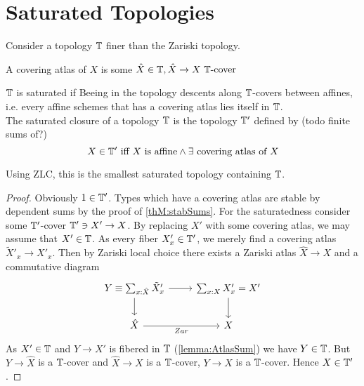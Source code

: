 

\section{Saturated Topologies}
Consider a topology $\mathbb{T}$ finer than the Zariski topology.
\begin{definition}
	A covering atlas of $X$ is  some $\hat X \in \mathbb{T} , \hat X \to X \text{ $\mathbb{T}$-cover }$
\end{definition}
\begin{definition}
	$\mathbb{T}$ is saturated if Beeing in the topology descents along $\mathbb{T}$-covers between affines, i.e. every affine schemes that has a covering atlas lies itself in $\mathbb{T}$. \\
	The saturated closure of a topology $\mathbb{T}$ is the topology $\mathbb{T}'$ defined by (todo finite sums of?)
	\[
	X \in \mathbb{T}' \text{ iff $X$ is affine} \land \exists \text{ covering atlas of } X 
	\]
\end{definition}
\begin{lemma}
	Using ZLC, this is the smallest saturated topology containing $\mathbb{T}$.
\end{lemma}
\begin{proof}
	Obviously $1 \in \mathbb{T}'$. Types which have a covering atlas are stable by dependent sums by the proof of \ref{thM:stabSums}. For the saturatedness consider some $\mathbb{T}'$-cover $\mathbb{T}' \ni X' \to X$. By replacing $X'$ with some covering atlas, we may assume that $X' \in \mathbb{T}$. As every fiber $X'_x \in \mathbb{T}'$, we merely find a covering atlas $\tilde X'_x \to X'_x$. Then by Zariski local choice there exists a Zariski atlas $\hat X \to X$ and a commutative diagram 
	\[\begin{tikzcd}
		Y \equiv {\sum_{x : \hat X}\tilde X'_x} & {\sum_{x : X}X'_x} = X' \\
		{\hat X} & X
		\arrow[from=1-1, to=1-2]
		\arrow[from=1-1, to=2-1]
		\arrow[from=1-2, to=2-2]
		\arrow["Zar"', from=2-1, to=2-2]
	\end{tikzcd}\]
	As $X' \in \mathbb{T}$ and $Y \to X'$ is fibered in $\mathbb{T}$ (\ref{lemma:AtlasSum}) we have $Y \in \mathbb{T}$. But $Y \to \hat X$ is a $\mathbb{T}$-cover and $\hat X \to X$ is a $\mathbb{T}$-cover, $Y \to X$ is a $\mathbb{T}$-cover. Hence $X \in \mathbb{T}'$.
\end{proof}
